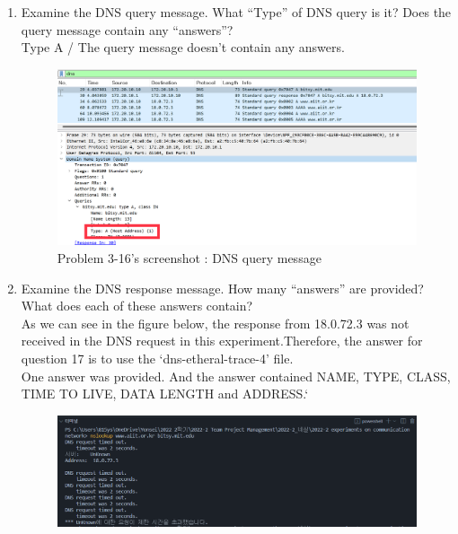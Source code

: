 \begin{enumerate}[label=\bfseries Problem \arabic*:,leftmargin=*,labelindent=1em]
\begin{figure}[!h]
        		\vspace{-10pt}
            \end{figure}
        \item Examine the DNS query message. 
        What “Type” of DNS query is it? Does the query message contain any “answers”?\\[0.2mm]
            \soln Type A / The query message doesn’t contain any answers.
            \vspace{-2mm}  
            \begin{figure}[!h]\centering
        		\includegraphics[width=.78\textwidth]{image/result_week01/Q3-g.png}
        		\caption{\footnotesize Problem 3-16's screenshot : DNS query message}
        		\vspace{-10pt}
            \end{figure}
        \item Examine the DNS response message. How many “answers” are provided?
        What does each of these answers contain?\\[0.2mm]
            \soln As we can see in the figure below, the response from 18.0.72.3 was not received in the DNS request in this experiment.Therefore,
            the answer for question 17 is to use the ‘dns-etheral-trace-4’ file.\\
            One answer was provided. And the answer contained NAME, TYPE, CLASS, TIME TO LIVE, DATA LENGTH and ADDRESS.`
            \vspace{-2mm}  
            \begin{figure}[!h]\centering
        		\includegraphics[width=.78\textwidth]{image/result_week01/Q3-h-1.png}

\end{figure}
\end{enumerate}
